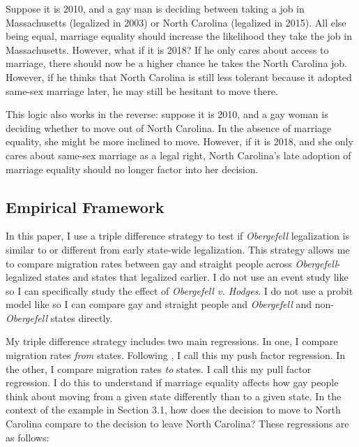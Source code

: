 \documentclass[12pt,letterpaper]{article}
\begin{document}
Suppose it is 2010, and a gay man is deciding between taking a job in Massachusetts (legalized in 2003) or North Carolina (legalized in 2015). All else being equal, marriage equality should increase the likelihood they take the job in Massachusetts. However, what if it is 2018? If he only cares about access to marriage, there should now be a higher chance he takes the North Carolina job. However, if he thinks that North Carolina is still less tolerant because it adopted same-sex marriage later, he may still be hesitant to move there.

This logic also works in the reverse: suppose it is 2010, and a gay woman is deciding whether to move out of North Carolina. In the absence of marriage equality, she might be more inclined to move. However, if it is 2018, and she only cares about same-sex marriage as a legal right, North Carolina’s late adoption of marriage equality should no longer factor into her decision. 




\subsection{Empirical Framework}

In this paper, I use a triple difference strategy to test if \textit{Obergefell} legalization is similar to or different from early state-wide legalization. This strategy allows me to compare migration rates between gay and straight people across \textit{Obergefell}-legalized states and states that legalized earlier. I do not use an event study like \citet{1} so I can specifically study the effect of \textit{Obergefell v. Hodges}. I do not use a probit model like \citet{12} so I can compare gay and straight people and \textit{Obergefell} and non-\textit{Obergefell} states directly.

My triple difference strategy includes two main regressions. In one, I compare migration rates \textit{from} states. Following \citet{12}, I call this my push factor regression. In the other, I compare migration rates \textit{to} states. I call this my pull factor regression. I do this to understand if marriage equality affects how gay people think about moving from a given state differently than to a given state. In the context of the example in Section 3.1, how does the decision to move to North Carolina compare to the decision to leave North Carolina? These regressions are as follows:
\end{document}
